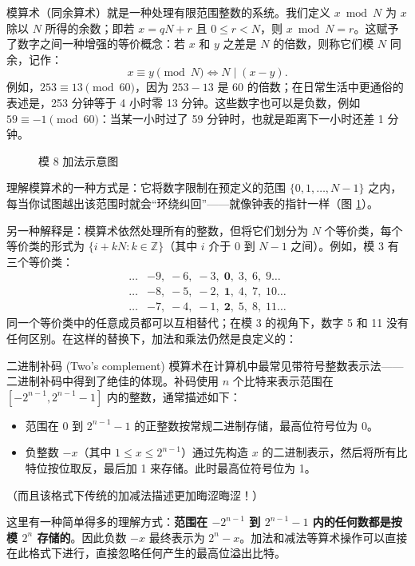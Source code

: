 模算术（同余算术）就是一种处理有限范围整数的系统。我们定义 $x \bmod N$ 为 $x$ 除以 $N$ 所得的余数；即若 $x = qN + r$ 且 $0 \le r < N$，则 $x \bmod N = r$。这赋予了数字之间一种增强的等价概念：若 $x$ 和 $y$ 之差是 $N$ 的倍数，则称它们模 $N$ 同余，记作：
\[
x \equiv y \pmod N \iff N \mid (x - y).
\]
例如，$253 \equiv 13 \pmod{60}$，因为 $253 - 13$ 是 60 的倍数；在日常生活中更通俗的表述是，253 分钟等于 4 小时零 13 分钟。这些数字也可以是负数，例如 $59 \equiv -1 \pmod{60}$：当某一小时过了 59 分钟时，也就是距离下一小时还差 1 分钟。

\begin{figure}[htbp]
\centering
{}
\caption{模 8 加法示意图}
\label{fig:mod8_addition}
\end{figure}

理解模算术的一种方式是：它将数字限制在预定义的范围 $\{0, 1, \dots, N-1\}$ 之内，每当你试图越出该范围时就会“环绕纠回”——就像钟表的指针一样（图 \ref{fig:mod8_addition}）。

另一种解释是：模算术依然处理所有的整数，但将它们划分为 $N$ 个等价类，每个等价类的形式为 $\{i + kN : k \in \mathbb{Z}\}$（其中 $i$ 介于 $0$ 到 $N-1$ 之间）。例如，模 3 有三个等价类：
\begin{align*}
\dots & -9,\; -6,\; -3,\; \bm{0},\; 3,\; 6,\; 9 \dots \\
\dots & -8,\; -5,\; -2,\; \bm{1},\; 4,\; 7,\; 10 \dots \\
\dots & -7,\; -4,\; -1,\; \bm{2},\; 5,\; 8,\; 11 \dots
\end{align*}
同一个等价类中的任意成员都可以互相替代；在模 3 的视角下，数字 5 和 11 没有任何区别。在这样的替换下，加法和乘法仍然是良定义的：

\begin{sidebarbox}{二进制补码 (Two's complement)}
模算术在计算机中最常见带符号整数表示法——二进制补码中得到了绝佳的体现。补码使用 $n$ 个比特来表示范围在 $[-2^{n-1}, 2^{n-1}-1]$ 内的整数，通常描述如下：
\begin{itemize}
    \item 范围在 $0$ 到 $2^{n-1}-1$ 的正整数按常规二进制存储，最高位符号位为 0。
    \item 负整数 $-x$（其中 $1 \le x \le 2^{n-1}$）通过先构造 $x$ 的二进制表示，然后将所有比特位按位取反，最后加 1 来存储。此时最高位符号位为 1。
\end{itemize}
（而且该格式下传统的加减法描述更加晦涩晦涩！）

这里有一种简单得多的理解方式：\textbf{范围在 $-2^{n-1}$ 到 $2^{n-1}-1$ 内的任何数都是按模 $2^n$ 存储的}。因此负数 $-x$ 最终表示为 $2^n - x$。加法和减法等算术操作可以直接在此格式下进行，直接忽略任何产生的最高位溢出比特。
\end{sidebarbox}

